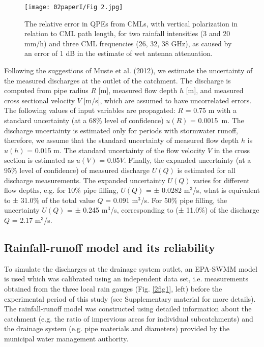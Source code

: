 \documentclass{ctuthesis}\usepackage[]{graphicx}\usepackage[]{color}
\begin{document}
\begin{figure}[h]
\begin{center}
\texttt{[image: 02paperI/Fig 2.jpg]}
\caption{The relative error in QPEs from CMLs, with vertical polarization in relation to CML path length, for two rainfall intensities (3 and 20 mm/h) and three CML frequencies (26, 32, 38 GHz), as caused by an error of 1 dB in the estimate of wet antenna attenuation.} \label{2fig2}
\end{center}
\end{figure}

Following the suggestions of Muste et al. (2012), we estimate the uncertainty of the measured discharges at the outlet of the catchment. The discharge is computed from pipe radius $R$ [m], measured flow depth $h$ [m], and measured cross sectional velocity $V$ [m/s], which are assumed to have uncorrelated errors. The following values of input variables are propagated: $R$ = 0.75 m with a standard uncertainty (at a 68\% level of confidence) $u(R)$ = 0.0015~m. The discharge uncertainty is estimated only for periods with stormwater runoff, therefore, we assume that the standard uncertainty of measured flow depth $h$ is $u(h)$ = 0.015 m. The standard uncertainty of the flow velocity $V$ in the cross section is estimated as $u(V)$ = 0.05$V$. Finally, the expanded uncertainty (at a 95\% level of confidence) of measured discharge $U(Q)$ is estimated for all discharge measurements. The expanded uncertainty $U(Q)$ varies for different flow depths, e.g. for 10\% pipe filling, $U(Q)$ = ± 0.0282 m$^3$/s, what is equivalent to ± 31.0\% of the total value $Q$ = 0.091 m$^3$/s. For 50\% pipe filling, the uncertainty $U(Q)$ = ± 0.245 m$^3$/s, corresponding to (± 11.0\%) of the discharge $Q$ = 2.17 m$^3$/s.

\subsection{Rainfall-runoff model and its reliability} \label{RRmodel}

To simulate the discharges at the drainage system outlet, an EPA-SWMM model is used which was calibrated using an independent data set, i.e. measurements obtained from the three local rain gauges (Fig. \ref{2fig1}, left) before the experimental period of this study (see Supplementary material for more details). The rainfall-runoff model was constructed using detailed information about the catchment (e.g. the ratio of impervious areas for individual subcatchments) and the drainage system (e.g. pipe materials and diameters) provided by the municipal water management authority.
\end{document}
